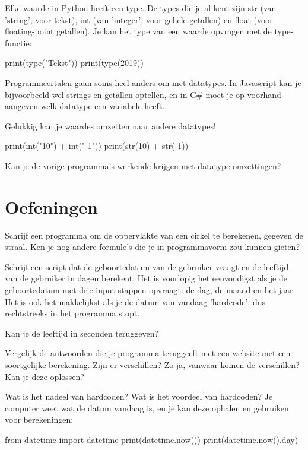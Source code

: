\documentclass[10pt,a4paper]{article}
\newenvironment{task}{\smallpencil}{}
\newenvironment{hard-task}{\begin{task} {\large \Lightning}}{\end{task}}
\begin{document}
Elke waarde in Python heeft een type. De types die je al kent zijn str (van 'string', voor tekst), int (van 'integer', voor gehele getallen) en float (voor floating-point getallen). Je kan het type van een waarde opvragen met de type-functie:
\begin{python}
print(type("Tekst"))
print(type(2019))
\end{python}

Programmeertalen gaan soms heel anders om met datatypes. In Javascript kan je bijvoorbeeld wel strings en getallen optellen, en in C\# moet je op voorhand aangeven welk datatype een variabele heeft.

Gelukkig kan je waardes omzetten naar andere datatypes!
\begin{python}
print(int("10") + int("-1"))
print(str(10) + str(-1))
\end{python}

\begin{task}
Kan je de vorige programma's werkende krijgen met datatype-omzettingen?
\end{task}

\section{Oefeningen}
\begin{task}
Schrijf een programma om de oppervlakte van een cirkel te berekenen, gegeven de straal. Ken je nog andere formule's die je in programmavorm zou kunnen gieten?
\end{task}

\begin{task}
Schrijf een script dat de geboortedatum van de gebruiker vraagt en de leeftijd van de gebruiker in dagen berekent. Het is voorlopig het eenvoudigst als je de geboortedatum met drie input-stappen opvraagt: de dag, de maand en het jaar. Het is ook het makkelijkst als je de datum van vandaag 'hardcode', dus rechtstreeks in het programma stopt.
\end{task}

\begin{task}
Kan je de leeftijd in seconden teruggeven?
\end{task}

\begin{hard-task}
Vergelijk de antwoorden die je programma teruggeeft met een website met een soortgelijke berekening. Zijn er verschillen? Zo ja, vanwaar komen de verschillen? Kan je deze oplossen?
\end{hard-task}

\begin{hard-task}
Wat is het nadeel van hardcoden? Wat is het voordeel van hardcoden? Je computer weet wat de datum vandaag is, en je kan deze ophalen en gebruiken voor berekeningen:
\begin{python}
from datetime import datetime
print(datetime.now())
print(datetime.now().day)
\end{python}
\end{hard-task}
\end{document}
